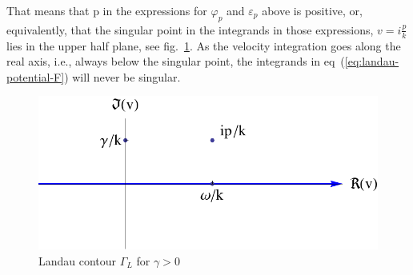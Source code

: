 \documentclass[physics,phd,nolot,nolof]{uccthesis}%
\begin{document}
That means that p in the expressions for $\varphi_p$ and $\varepsilon_p$ above is positive, or, equivalently, that the singular point in the integrands in those expressions, $v=i\frac{p}{k}$ lies in the upper half plane, see fig.~\ref{fig:landaucontourplus}.
As the velocity integration goes along the real axis, i.e., always below the singular point, the integrands in eq~(\ref{eq:landau-potential-F})  will never be singular. 
\begin{figure}[ht]
	\begin{center}
\includegraphics[width=.75\textwidth]{plus.pdf}
	\end{center}
	\caption{Landau contour $\Gamma_L$ for $\gamma>0$ }
	\label{fig:landaucontourplus}
\end{figure}
\end{document}
